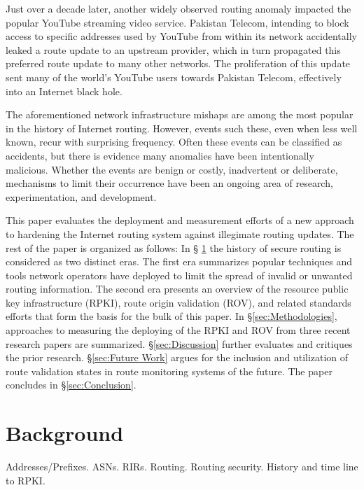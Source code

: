 \documentclass[sigconf]{acmart}
\begin{document}
Just over a decade later, another widely observed routing anomaly
impacted the popular YouTube streaming video
service.\cite{brown_pakistan_2008}  Pakistan Telecom, intending to block
access to specific addresses used by YouTube from within its network
accidentally leaked a route update to an upstream provider, which in
turn propagated this preferred route update to many other networks.
The proliferation of this update sent many of the world's YouTube users
towards Pakistan Telecom, effectively into an Internet black hole.

The aforementioned network infrastructure mishaps are among the most
popular in the history of Internet routing.  However, events such these,
even when less well known, recur with surprising frequency.  Often these
events can be classified as accidents, but there is evidence many
anomalies have been intentionally malicious.\cite{madory_bgp_2018}
Whether the events are benign or costly, inadvertent or deliberate,
mechanisms to limit their occurrence have been an ongoing area of
research, experimentation, and development.

This paper evaluates the deployment and measurement efforts of a new
approach to hardening the Internet routing system against illegimate
routing updates.  The rest of the paper is organized as follows: In \S
\ref{sec:Background} the history of secure routing is considered as two
distinct eras.  The first era summarizes popular techniques and tools
network operators have deployed to limit the spread of invalid or
unwanted routing information.  The second era presents an overview of
the resource public key infrastructure (RPKI), route origin validation
(ROV), and related standards efforts that form the basis for the bulk of
this paper.  In \S \ref{sec:Methodologies}, approaches to measuring the
deploying of the RPKI and ROV from three recent research papers are
summarized.    \S \ref{sec:Discussion} further evaluates and critiques
the prior research.  \S \ref{sec:Future Work} argues for the inclusion
and utilization of route validation states in route monitoring systems
of the future.  The paper concludes in \S \ref{sec:Conclusion}.

\section{Background}\label{sec:Background}

Addresses/Prefixes.  ASNs.  RIRs.  Routing.  Routing security.  History
and time line to RPKI.
\end{document}
